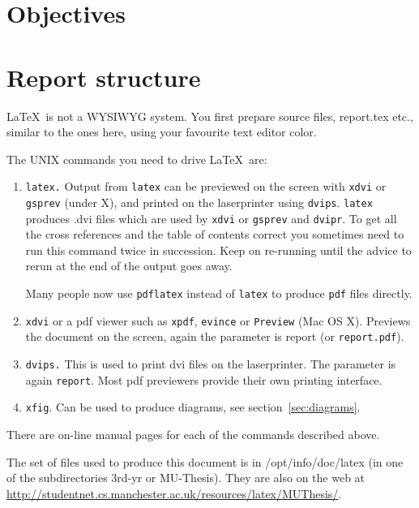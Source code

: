 \section{Objectives}
\label{sec:obj}

\section{Report structure}

\LaTeX\ is not a WYSIWYG system. You first prepare source files,
\textsf{report.tex} etc., similar to the ones here, using your
favourite text editor color.

The UNIX commands you need to drive \LaTeX\ are:
\begin{enumerate}
	\item \texttt{latex.} Output from \texttt{latex} can be previewed on
	      the screen with \texttt{xdvi} or \texttt{gsprev} (under X), and printed on the laserprinter using  \texttt{dvips}.
	      \texttt{latex} produces \textsf{.dvi} files which are used by
	      \texttt{xdvi} or \texttt{gsprev} and \texttt{dvipr}.  To get all the
	      cross references and the table of contents correct you sometimes
	      need to run this command twice in succession.  Keep on re-running
	      until the advice to rerun at the end of the output goes away.

	      Many people now use \texttt{pdflatex} instead of \texttt{latex} to produce \texttt{pdf} files directly.

	\item \texttt{xdvi} or a pdf viewer such as \texttt{xpdf}, \texttt{evince} or \texttt{Preview} (Mac OS X). Previews the document on the
	      screen, again the parameter is \textsf{report} (or \texttt{report.pdf}).

	\item \texttt{dvips.} This is used to print dvi files on the laserprinter.  The
	      parameter is again \texttt{report}. Most pdf previewers provide their own printing interface.

	\item \texttt{xfig}. Can be used to produce diagrams, see
	      section~\ref{sec:diagrams}.

\end{enumerate}
There are on-line manual pages for each of the commands described above.

The set of files used to produce this document is in
\textsf{/opt/info/doc/latex} (in one of the subdirectories
\textsf{3rd-yr} or \textsf{MU-Thesis}).  They are also on the web at \url{http://studentnet.cs.manchester.ac.uk/resources/latex/MUThesis/}.

